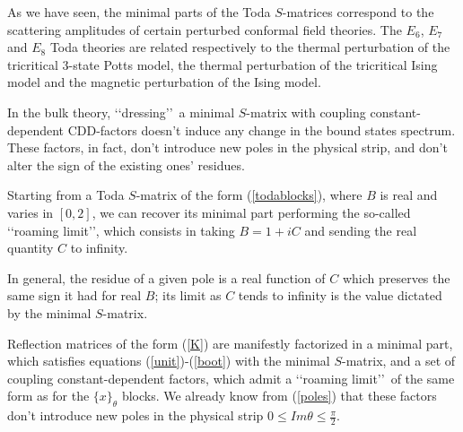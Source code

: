 \documentclass[a4paper,12pt]{report}
\begin{document}
As we have seen, the minimal parts of the Toda $S$-matrices correspond to the scattering amplitudes of certain
perturbed conformal field theories. The $E_{6}$, $E_{7}$ and $E_{8}$ Toda theories are related respectively to
the thermal perturbation of the tricritical 3-state Potts model, the thermal perturbation of the tricritical
Ising model and the magnetic perturbation of the Ising model.


In the bulk theory, \lq\lq dressing\rq\rq \, a minimal $S$-matrix with coupling constant-dependent CDD-factors
doesn't induce any change in the bound states spectrum. These factors, in fact, don't introduce new poles in the
physical strip, and don't alter the sign of the existing ones' residues.

Starting from a Toda $S$-matrix of the form (\ref{todablocks}), where $B$ is real and varies in $[0,2]$, we can
recover its minimal part performing the so-called \lq\lq roaming limit\rq\rq, which consists in taking $B=1+iC$
and sending the real quantity $C$ to infinity.

In general, the residue of a given pole is a real function of $C$ which preserves the same sign it had for real
$B$; its limit as $C$ tends to infinity is the value dictated by the minimal $S$-matrix.

Reflection matrices of the form (\ref{K}) are manifestly factorized in a minimal part, which satisfies equations
(\ref{unit})-(\ref{boot}) with the minimal $S$-matrix, and a set of coupling constant-dependent factors, which
admit a \lq\lq roaming limit\rq\rq \, of the same form as for the $\{x\}_{\theta}$ blocks. We already know from
(\ref{poles}) that these factors don't introduce new poles in the physical strip $0\leq
Im\theta\leq\frac{\pi}{2}$.
\end{document}
